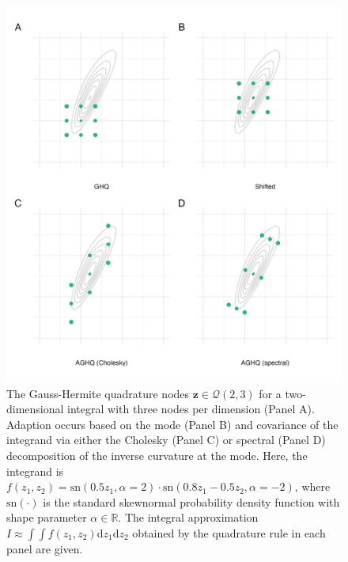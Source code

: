 \documentclass[a4paper, nobind]{templates/ociamthesis}
\begin{document}
\begin{figure}
\includegraphics[width=0.95\linewidth]{figures/naomi-aghq/aghq-demo} \caption{The Gauss-Hermite quadrature nodes \(\mathbf{z} \in \mathcal{Q}(2, 3)\) for a two-dimensional integral with three nodes per dimension (Panel A). Adaption occurs based on the mode (Panel B) and covariance of the integrand via either the Cholesky (Panel C) or spectral (Panel D) decomposition of the inverse curvature at the mode. Here, the integrand is \(f(z_1, z_2) = \text{sn}(0.5 z_1, \alpha = 2) \cdot \text{sn}(0.8 z_1 - 0.5 z_2, \alpha = -2)\), where \(\text{sn}(\cdot)\) is the standard skewnormal probability density function with shape parameter \(\alpha \in \mathbb{R}\). The integral approximation \(I \approx \int \int f(z_1, z_2) \text{d} z_1 \text{d} z_2\) obtained by the quadrature rule in each panel are given.}\label{fig:aghq-demo}
\end{figure}
\end{document}
